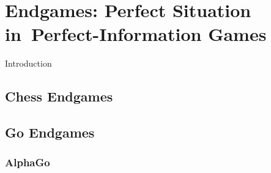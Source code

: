 \chapter{Endgames: Perfect Situation in~Perfect-Information Games}
Introduction \todo

\section{Chess Endgames}
\todo

\section{Go Endgames}
\todo

\subsection{AlphaGo}
\todo
